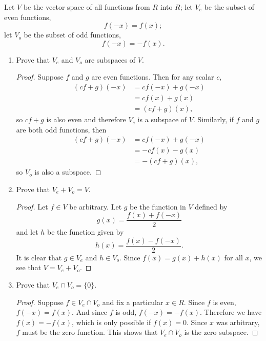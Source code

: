  Let $V$ be the vector space of all functions from $R$ into
$R$; let $V_e$ be the subset of even functions,
\begin{equation*}
  f(-x) = f(x);
\end{equation*}
let $V_o$ be the subset of odd functions,
\begin{equation*}
  f(-x) = -f(x).
\end{equation*}
\begin{enumerate}
\item Prove that $V_e$ and $V_o$ are subspaces of $V$.
  \begin{proof}
    Suppose $f$ and $g$ are even functions. Then for any scalar $c$,
    \begin{align*}
      (cf + g)(-x) &= cf(-x) + g(-x) \\
                   &= cf(x) + g(x) \\
                   &= (cf + g)(x),
    \end{align*}
    so $cf + g$ is also even and therefore $V_e$ is a subspace of
    $V$. Similarly, if $f$ and $g$ are both odd functions, then
    \begin{align*}
      (cf + g)(-x) &= cf(-x) + g(-x) \\
                   &= -cf(x) - g(x) \\
                   &= -(cf + g)(x),
    \end{align*}
    so $V_o$ is also a subspace.
  \end{proof}
\item Prove that $V_e + V_o = V$.
  \begin{proof}
    Let $f\in V$ be arbitrary. Let $g$ be the function in $V$ defined by
    \begin{equation*}
      g(x) = \frac{f(x) + f(-x)}2
    \end{equation*}
    and let $h$ be the function given by
    \begin{equation*}
      h(x) = \frac{f(x) - f(-x)}2.
    \end{equation*}
    It is clear that $g\in V_e$ and $h\in V_o$. Since
    $f(x) = g(x) + h(x)$ for all $x$, we see that $V = V_e + V_o$.
  \end{proof}
\item Prove that $V_e\cap V_o = \{0\}$.
  \begin{proof}
    Suppose $f\in V_e\cap V_o$ and fix a particular $x\in R$. Since
    $f$ is even, $f(-x) = f(x)$. And since $f$ is odd,
    $f(-x) = -f(x)$. Therefore we have $f(x) = -f(x)$, which is only
    possible if $f(x) = 0$. Since $x$ was arbitrary, $f$ must be the
    zero function. This shows that $V_e\cap V_o$ is the zero subspace.
  \end{proof}
\end{enumerate}
